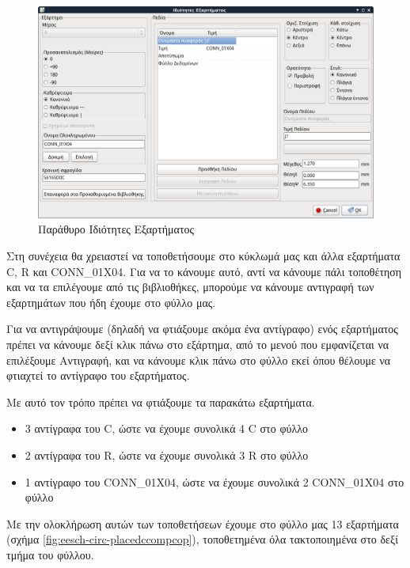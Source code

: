 \documentclass[a4paper]{article}
\begin{document}
\begin{figure}
  \begin{center}
    \includegraphics[width=.5\textwidth]{img/eesch-dial-compprop.png}
    \caption{Παράθυρο Ιδιότητες Εξαρτήματος}
    \label{fig:eesch-dial-compprop}
  \end{center}
\end{figure}


Στη συνέχεια θα χρειαστεί να τοποθετήσουμε στο κύκλωμά μας και άλλα εξαρτήματα C, R και CONN\_01X04. Για να το κάνουμε αυτό, αντί να κάνουμε πάλι τοποθέτηση και να τα επιλέγουμε από τις βιβλιοθήκες, μπορούμε να κάνουμε αντιγραφή των εξαρτημάτων που ήδη έχουμε στο φύλλο μας. 

Για να αντιγράψουμε (δηλαδή να φτιάξουμε ακόμα ένα αντίγραφο) ενός εξαρτήματος πρέπει να κάνουμε δεξί κλικ πάνω στο εξάρτημα, από το μενού που εμφανίζεται να επιλέξουμε Αντιγραφή, και να κάνουμε κλικ πάνω στο φύλλο εκεί όπου θέλουμε να φτιαχτεί το αντίγραφο του εξαρτήματος. 

Με αυτό τον τρόπο πρέπει να φτιάξουμε τα παρακάτω εξαρτήματα.

\begin{itemize}
    \item 3 αντίγραφα του C, ώστε να έχουμε συνολικά 4 C στο φύλλο
    \item 2 αντίγραφα του R, ώστε να έχουμε συνολικά 3 R στο φύλλο
    \item 1 αντίγραφο του CONN\_01X04, ώστε να έχουμε συνολικά 2 CONN\_01X04 στο φύλλο
\end{itemize}

Με την ολοκλήρωση αυτών των τοποθετήσεων έχουμε στο φύλλο μας 13 εξαρτήματα (σχήμα \ref{fig:eesch-circ-placedccompcop}), τοποθετημένα όλα τακτοποιημένα στο δεξί τμήμα του φύλλου.
\end{document}

